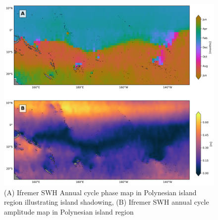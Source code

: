 \documentclass[12pt,twoside]{article}
\begin{document}

\begin{figure}[htb]
\centering
\includegraphics[width=1.0\textwidth]{figs/lsf_parameters/Phase_amp_topography_overlap.png}
\caption{(A) Ifremer SWH Annual cycle phase map in Polynesian island region illustrating island shadowing, (B) Ifremer SWH annual cycle amplitude map in Polynesian island region }
\label{phase_amp_topo_comp}
\end{figure}
\end{document}

